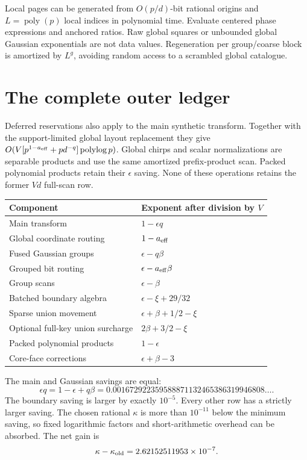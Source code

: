 \documentclass[11pt]{article}
\newcommand{\poly}{\operatorname{poly}}
\newcommand{\plog}{\operatorname{polylog}}
\begin{document}
Local pages can be generated from $O(p/d)$-bit rational origins and $L=\poly(p)$ local indices in polynomial time. Evaluate centered phase expressions and anchored ratios. Raw global squares or unbounded global Gaussian exponentials are not data values. Regeneration per group/coarse block is amortized by $L^g$, avoiding random access to a scrambled global catalogue.

\section{The complete outer ledger}

Deferred reservations also apply to the main synthetic transform. Together with the support-limited global layout replacement they give
$O(V[p^{1-a_{\rm eff}}+p d^{-q}]\plog p)$.
Global chirps and scalar normalizations are separable products and use the same amortized prefix-product scan. Packed polynomial products retain their $\epsilon$ saving. None of these operations retains the former $Vd$ full-scan row.

\begin{center}
\begin{tabular}{@{}ll@{}}
\toprule
Component & Exponent after division by $V$\\
\midrule
Main transform & $1-\epsilon q$\\
Global coordinate routing & $1-a_{\rm eff}$\\
Fused Gaussian groups & $\epsilon-q\beta$\\
Grouped bit routing & $\epsilon-a_{\rm eff}\beta$\\
Group scans & $\epsilon-\beta$\\
Batched boundary algebra & $\epsilon-\xi+29/32$\\
Sparse union movement & $\epsilon+\beta+1/2-\xi$\\
Optional full-key union surcharge & $2\beta+3/2-\xi$\\
Packed polynomial products & $1-\epsilon$\\
Core-face corrections & $\epsilon+\beta-3$\\
\bottomrule
\end{tabular}
\end{center}
The main and Gaussian savings are equal:
\[
 \epsilon q=1-\epsilon+q\beta
 =0.001672922359588871132465386319946808\ldots .
\]
The boundary saving is larger by exactly $10^{-5}$. Every other row has a strictly larger saving. The chosen rational $\kappa$ is more than $10^{-11}$ below the minimum saving, so fixed logarithmic factors and short-arithmetic overhead can be absorbed. The net gain is
\[
 \kappa-\kappa_{\rm old}=2.62152511953\times10^{-7}.
\]
\end{document}
